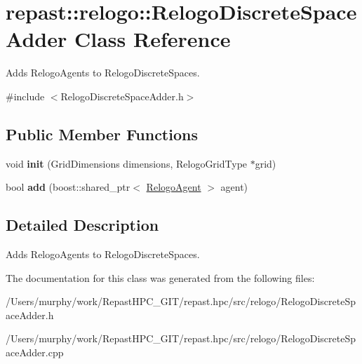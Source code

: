 \hypertarget{classrepast_1_1relogo_1_1_relogo_discrete_space_adder}{\section{repast\-:\-:relogo\-:\-:Relogo\-Discrete\-Space\-Adder Class Reference}
\label{classrepast_1_1relogo_1_1_relogo_discrete_space_adder}
}


Adds Relogo\-Agents to Relogo\-Discrete\-Spaces.  




{\ttfamily \#include $<$Relogo\-Discrete\-Space\-Adder.\-h$>$}

\subsection*{Public Member Functions}
\begin{DoxyCompactItemize}
\item 
\hypertarget{classrepast_1_1relogo_1_1_relogo_discrete_space_adder_ac8700b679f36c3a2d6fd337567763bd2}{void {\bfseries init} (Grid\-Dimensions dimensions, Relogo\-Grid\-Type $\ast$grid)}\label{classrepast_1_1relogo_1_1_relogo_discrete_space_adder_ac8700b679f36c3a2d6fd337567763bd2}

\item 
\hypertarget{classrepast_1_1relogo_1_1_relogo_discrete_space_adder_ab37d7d2fcbe6543ccd55526c4342ec58}{bool {\bfseries add} (boost\-::shared\-\_\-ptr$<$ \hyperlink{classrepast_1_1relogo_1_1_relogo_agent}{Relogo\-Agent} $>$ agent)}\label{classrepast_1_1relogo_1_1_relogo_discrete_space_adder_ab37d7d2fcbe6543ccd55526c4342ec58}

\end{DoxyCompactItemize}


\subsection{Detailed Description}
Adds Relogo\-Agents to Relogo\-Discrete\-Spaces. 

The documentation for this class was generated from the following files\-:\begin{DoxyCompactItemize}
\item 
/\-Users/murphy/work/\-Repast\-H\-P\-C\-\_\-\-G\-I\-T/repast.\-hpc/src/relogo/Relogo\-Discrete\-Space\-Adder.\-h\item 
/\-Users/murphy/work/\-Repast\-H\-P\-C\-\_\-\-G\-I\-T/repast.\-hpc/src/relogo/Relogo\-Discrete\-Space\-Adder.\-cpp\end{DoxyCompactItemize}
